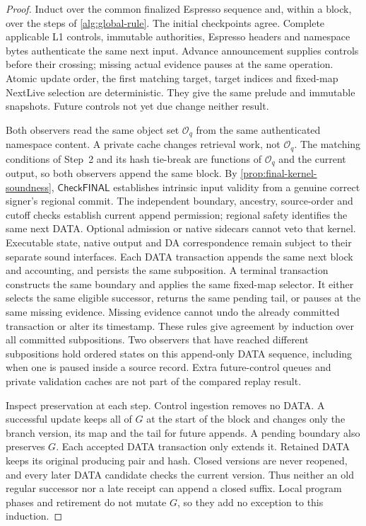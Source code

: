 \documentclass[11pt,a4paper]{article}
\newcommand{\tagg}[1]{\ensuremath{\mathsf{#1}}}
\begin{document}
\begin{proof}
Induct over the common finalized Espresso sequence and, within a block,
over the steps of \cref{alg:global-rule}.
The initial checkpoints agree. Complete applicable L1 controls,
immutable authorities, Espresso headers and namespace bytes authenticate
the same next input. Advance announcement supplies controls before their
crossing; missing actual evidence pauses at the same operation. Atomic
update order, the first matching target, target indices and fixed-map
NextLive selection are deterministic. They give the same prelude and
immutable snapshots. Future controls not yet due change neither result.

Both observers read the same object set $\mathcal O_q$ from the same
authenticated namespace content. A private cache changes retrieval work,
not $\mathcal O_q$. The matching conditions of Step~2 and its hash tie-break are
functions of $\mathcal O_q$ and the current output, so both observers
append the same block. By \cref{prop:final-kernel-soundness},
\tagg{CheckFINAL} establishes intrinsic input validity from a genuine
correct signer's regional commit. The independent boundary, ancestry,
source-order and cutoff checks establish current append permission;
regional safety identifies the same next DATA. Optional admission or
native sidecars cannot veto that kernel. Executable state, native output
and DA correspondence remain subject to their separate sound interfaces. Each DATA transaction appends the
same next block and accounting, and persists the same subposition.
A terminal transaction constructs the same boundary and applies the same
fixed-map selector. It either selects the same eligible successor, returns
the same pending tail, or pauses at the same missing evidence. Missing evidence
cannot undo the already committed transaction or alter its timestamp.
These rules give agreement by induction over all committed subpositions.
Two observers that have reached different subpositions hold ordered
states on this append-only DATA sequence, including when one is paused
inside a source record. Extra future-control queues and private validation
caches are not part of the compared replay result.

Inspect preservation at each step. Control ingestion removes no DATA. A
successful update keeps all of $G$ at the start of the block and changes
only the branch version, its map and the tail for future appends. A
pending boundary also preserves $G$. Each accepted DATA transaction only extends it. Retained DATA keeps its
original producing pair and hash. Closed versions are never reopened,
and every later DATA candidate checks the current version. Thus
neither an old regular successor nor a late receipt can append a closed
suffix. Local program phases and retirement do not mutate $G$, so they
add no exception to this induction.
\end{proof}
\end{document}
